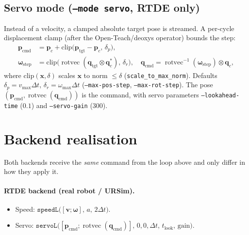 \documentclass[11pt]{article}
\newcommand{\quat}[1]{\bm{#1}}
\newcommand{\vp}{\bm{p}}
\newcommand{\vv}{\bm{v}}
\newcommand{\vw}{\bm{\omega}}
\DeclareMathOperator{\rotvec}{rotvec}
\begin{document}
\subsection{Servo mode (\texttt{--mode servo}, RTDE only)}
Instead of a velocity, a clamped absolute target pose is streamed. A per-cycle
displacement clamp (after the Open-Teach/deoxys operator) bounds the step:
\begin{align}
  \vp_{\text{cmd}} &= \vp_{c} + \mathrm{clip}\big(\vp_{\text{tgt}}-\vp_{c},\,\delta_p\big),\\
  \vw_{\text{step}} &= \mathrm{clip}\big(\rotvec(\quat{q}_{\text{tgt}}\otimes\quat{q}_{c}^{*}),\,\delta_r\big),\quad
  \quat{q}_{\text{cmd}} = \rotvec^{-1}(\vw_{\text{step}})\otimes\quat{q}_{c},
\end{align}
where $\mathrm{clip}(\bm{x},\delta)$ scales $\bm{x}$ to norm $\le\delta$
(\texttt{scale\_to\_max\_norm}). Defaults
$\delta_p=v_{\max}\Delta t$, $\delta_r=\omega_{\max}\Delta t$
(\texttt{--max-pos-step}, \texttt{--max-rot-step}). The pose
$(\vp_{\text{cmd}},\rotvec(\quat{q}_{\text{cmd}}))$ is the command, with
servo parameters \texttt{--lookahead-time} ($0.1$) and \texttt{--servo-gain}
($300$).

\section{Backend realisation}\label{sec:backends}
Both backends receive the \emph{same} command from the loop above and only
differ in how they apply it.

\paragraph{RTDE backend (real robot / URSim).}
\begin{itemize}[leftmargin=1.5em]
  \item Speed: $\texttt{speedL}\big([\vv;\vw],\,a,\,2\Delta t\big)$.
  \item Servo: $\texttt{servoL}\big([\vp_{\text{cmd}};\rotvec(\quat{q}_{\text{cmd}})],\,0,0,\Delta t,\,t_{\text{look}},\,\text{gain}\big)$.
\end{itemize}
\end{document}

